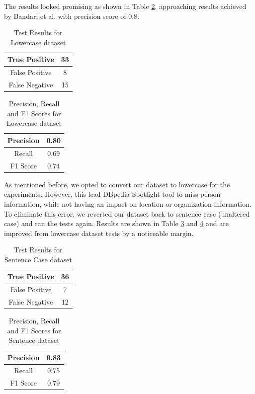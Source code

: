 \documentclass[conference]{IEEEtran}
\begin{document}
The results looked promising as shown in Table \ref{prf1_lc}, approaching results achieved by Bandari et al. \cite{bandari_pulse_2012} with precision score of 0.8.


\begin{table}[!t]
	\caption{Test Results for Lowercase dataset}
	\label{test_result_lc}
	\centering
	\begin{tabular}{|c|c|}
		\hline 
		True Positive & 33 \\ 
		\hline 
		False Positive & 8 \\ 
		\hline 
		False Negative & 15 \\ 
		\hline 
	\end{tabular} 
\end{table}
\begin{table}[!t]
	\caption{Precision, Recall and F1 Scores for Lowercase dataset}
	\label{prf1_lc}
	\centering
	\begin{tabular}{|c|c|}
		\hline
		Precision & 0.80 \\
		\hline
		Recall & 0.69 \\
		\hline
		F1 Score & 0.74 \\
		\hline
	\end{tabular}
\end{table}


 As mentioned before, we opted to convert our dataset to lowercase for the experiments. However, this lead DBpedia Spotlight tool to miss person information, while not having an impact on location or organization information. To eliminate this error, we reverted our dataset back to sentence case (unaltered case) and ran the tests again. Results are shown in Table \ref{test_result_sc} and \ref{prf1_sc} and are improved from lowercase dataset tests by a noticeable margin.
\begin{table}[!t]
	\caption{Test Results for Sentence Case dataset}
	\label{test_result_sc}
	\centering
	\begin{tabular}{|c|c|}
		\hline 
		True Positive & 36 \\ 
		\hline 
		False Positive & 7 \\ 
		\hline 
		False Negative & 12 \\ 
		\hline 
	\end{tabular} 
\end{table}
\begin{table}[!t]
	\caption{Precision, Recall and F1 Scores for Sentence dataset}
	\label{prf1_sc}
	\centering
	\begin{tabular}{|c|c|}
		\hline
		Precision & 0.83 \\
		\hline
		Recall & 0.75 \\
		\hline
		F1 Score & 0.79 \\
		\hline
	\end{tabular}
\end{table}
\end{document}
